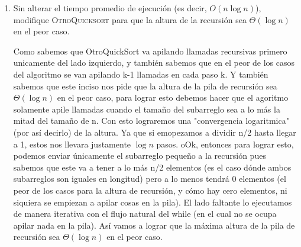 \documentclass{article}
\begin{document}
\begin{enumerate}
\begin{enumerate}
            \medskip
            Ya que cuando acamodamos el pivote en su posición (SPG en la posición final) del lado izquierdo nos
            quedan n-1 elementos, a los cuales les volvemos a aplicar OtroQuicksort (del lado izquierdo nos quedan n-2 elem.) y así sucesivamente hasta que nos quedemos con un subarreglo de longitud 1.
            Lo que nos deja una altura de la pila de recursión de n (contando la llamada incial), que es $\Theta(n)$.

            
            \item Sin alterar el tiempo promedio de ejecuci\'on (es decir, $O(n
                \log n)$), modifique \textsc{OtroQuicksort} para que la altura
                de la recursi\'on sea $\Theta(\log n)$ en el peor caso.

            Como sabemos que OtroQuickSort va apilando llamadas recursivas primero unicamente
            del lado izquierdo, y también sabemos que en el peor de los casos del algoritmo
            se van apilando k-1 llamadas en cada paso k. Y también sabemos que este inciso
            nos pide que la altura de la pila de recursión sea $\Theta(\log n)$ en el peor caso, para
            lograr esto debemos hacer que el agoritmo solamente apile llamadas cuando el tamaño del
            subarreglo sea a lo más la mitad del tamaño de n. Con esto lograremos una "convergencia
            logaritmica" (por así decirlo) de la altura. Ya que si emopezamos a dividir n/2 hasta
            llegar a 1, estos nos llevara justamente $\log n$ pasos. oOk, entonces para lograr esto, podemos
            enviar únicamente el subarreglo pequeño a la recursión pues sabemos que este va a tener a lo más
            n/2 elementos (es el caso dónde ambos subarreglos son iguales en longitud) pero a lo menos tendrá
            0 elementos (el peor de los casos para la altura de recursión, y cómo hay cero elementos, ni siquiera
            se empiezan a apilar cosas en la pila). El lado faltante lo ejecutamos de manera iterativa con el
            flujo natural del while (en el cual no se ocupa apilar nada en la pila). Así vamos a lograr que
            la máxima altura de la pila de recursión sea $\Theta(\log n)$ en el peor caso.


\end{enumerate}
\end{enumerate}
\end{document}
